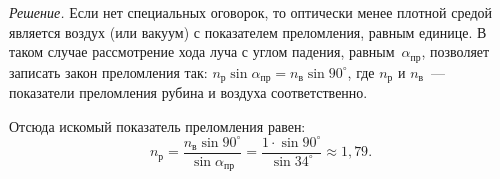 \documentclass[main.tex]{subfiles}
\begin{document}
\smallskip

\noindent\emph{Решение.} Если нет специальных оговорок, то оптически менее плотной средой является воздух (или вакуум) с показателем преломления, равным единице. В таком случае рассмотрение хода луча с углом падения, равным~$\alpha_\text{пр}$, позволяет записать закон преломления так: $n_\text{р}\sin\alpha_\text{пр}=n_\text{в}\sin90^\circ$, где $n_\text{р}$ и $n_\text{в}$~--- показатели преломления рубина и воздуха соответственно.

Отсюда искомый показатель преломления равен:
\begin{equation*}
    n_\text{р}=\frac{n_\text{в}\sin90^\circ}{\sin\alpha_\text{пр}}=\frac{1\cdot\sin90^\circ}{\sin34^\circ}\approx1{,}79.
\end{equation*}














 
\end{document}
